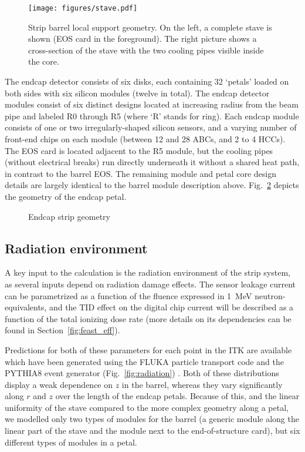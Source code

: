 \begin{figure}[ht]
\centering
\texttt{[image: figures/stave.pdf]}
\caption{Strip barrel local support geometry. On the left, a complete stave is shown (EOS card in the foreground). The right picture shows a cross-section of the stave with the two cooling pipes visible inside the core. }
\label{fig:barrelgeometry}
\end{figure}

The endcap detector consists of six disks, each containing 32 `petals' loaded on
both sides with six silicon modules (twelve in total).
The endcap detector modules consist of six distinct designs located at increasing radius from the
beam pipe and labeled R0 through R5 (where `R' stands for ring). Each endcap module consists of one
or two irregularly-shaped silicon sensors, and a varying number of front-end chips on each module
(between 12 and 28 ABCs, and 2 to 4 HCCs). The EOS card is located adjacent to the R5 module, but the
cooling pipes (without electrical breaks) run directly underneath it without a shared heat path, in contrast to the barrel EOS.
The remaining module and petal core design details are largely identical to the barrel module description above.
Fig.~\ref{fig:endcapgeometry} depicts the geometry of the endcap petal.

\begin{figure}[ht]
\centering
\caption{Endcap strip geometry}
\label{fig:endcapgeometry}
\end{figure}

\subsection{Radiation environment}
A key input to the calculation is the radiation environment of the strip system, as several inputs depend on radiation damage effects. The sensor leakage current can be parametrized as  a function of the fluence expressed in 1~MeV neutron-equivalents, and the TID effect on the digital chip current will be described as a function of the total ionizing dose rate (more details on its dependencies can be found in Section~\ref{fig:feast_eff}). 

Predictions for both of these parameters for each point in the ITK are available which have been generated using the FLUKA particle transport code and the PYTHIA8 event generator (Fig.~\ref{fig:radiation}) \cite{background}. Both of these distributions display a weak dependence on $z$ in the barrel, whereas they vary significantly along $r$ and $z$ over the length of the endcap petals. Because of this, and the linear uniformity of the stave compared to the more complex geometry along a petal, we modelled only two types of modules for the barrel (a generic module along the linear part of the stave and the module next to the end-of-structure card), but six different types of modules in a petal.

